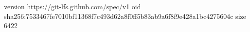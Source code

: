version https://git-lfs.github.com/spec/v1
oid sha256:7533467fe7010bf11368f7c493d62a8f0ff5b83ab9a6f8f9e428a1bc4275604c
size 6422
